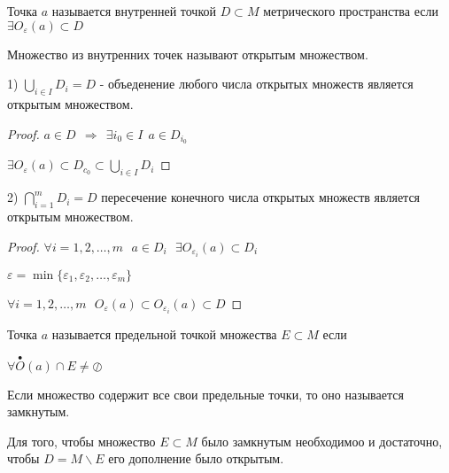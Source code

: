 \begin{define}
  Точка $a$ называется внутренней точкой $D \subset M$ метрического
  пространства если  $\exists O_{\varepsilon}(a) \subset D$
\end{define}

\begin{define}
  Множество из внутренних точек называют открытым множеством.
\end{define}

\begin{block}[Свойства]
  1) $\bigcup_{i \in I} D_i = D$ - объеденение любого числа открытых множеств
  является открытым множеством.

  \begin{proof}
    $a \in D ~~ \Rightarrow ~~ \exists i_0 \in I ~~ a \in D_{i_0}$

    $\exists O_{\varepsilon}(a) \subset D_{c_0} \subset \bigcup_{i \in I} D_i$
  \end{proof}

  2) $\bigcap_{i=1}^m D_i = D$ пересечение конечного числа открытых
  множеств является открытым множеством.

  \begin{proof}
    $\forall i = 1, 2, \ldots, m ~~~ a \in D_i ~~~
    \exists O_{\varepsilon_i}(a) \subset D_i$

    $\varepsilon = \min \{\varepsilon_1, \varepsilon_2, \ldots, \varepsilon_m\}$

    $\forall i = 1, 2, \ldots, m ~~~
    O_{\varepsilon}(a) \subset O_{\varepsilon_i}(a) \subset D$
  \end{proof}
\end{block}

\begin{define}
  Точка $a$ называется предельной точкой множества $E \subset M$ если

  $\forall \stackrel{\bullet}{O}(a) \cap E \not= \oslash$
\end{define}

\begin{define}
  Если множество содержит все свои предельные точки, то оно называется
  замкнутым.
\end{define}

\begin{theorem}
  Для того, чтобы множество $E \subset M$ было замкнутым необходимоо и
  достаточно, чтобы $D = M\backslash E$ его дополнение было открытым.
\end{theorem}

